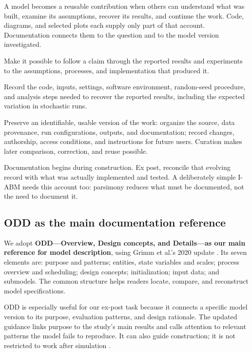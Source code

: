\documentclass[11pt,a4paper]{article}
\begin{document}
A model becomes a reusable contribution when others can understand what was built, examine its assumptions, recover its results, and continue the work. Code, diagrams, and selected plots each supply only part of that account. Documentation connects them to the question and to the model version investigated.

\begin{description}[style=nextline,leftmargin=0pt,labelindent=0pt,labelsep=0pt,labelwidth=0pt,itemindent=0pt,itemsep=5pt]
\item[Auditability] Make it possible to follow a claim through the reported results and experiments to the assumptions, processes, and implementation that produced it.
\item[Reproducibility] Record the code, inputs, settings, software environment, random-seed procedure, and analysis steps needed to recover the reported results, including the expected variation in stochastic runs.
\item[Curation] Preserve an identifiable, usable version of the work: organize the source, data provenance, run configurations, outputs, and documentation; record changes, authorship, access conditions, and instructions for future users. Curation makes later comparison, correction, and reuse possible.
\end{description}

Documentation begins during construction. Ex post, reconcile that evolving record with what was actually implemented and tested. A deliberately simple I-ABM needs this account too: parsimony reduces what must be documented, not the need to document it.

\subsection{ODD as the main documentation reference}

We adopt \textbf{ODD---Overview, Design concepts, and Details---as our main reference for model description}, using Grimm et al.'s 2020 update \cite{grimm_odd_2020}. Its seven elements are: purpose and patterns; entities, state variables and scales; process overview and scheduling; design concepts; initialization; input data; and submodels. The common structure helps readers locate, compare, and reconstruct model specifications.

ODD is especially useful for our ex-post task because it connects a specific model version to its purpose, evaluation patterns, and design rationale. The updated guidance links purpose to the study's main results and calls attention to relevant patterns the model fails to reproduce. It can also guide construction; it is not restricted to work after simulation \cite{grimm_odd_2020}.
\end{document}
